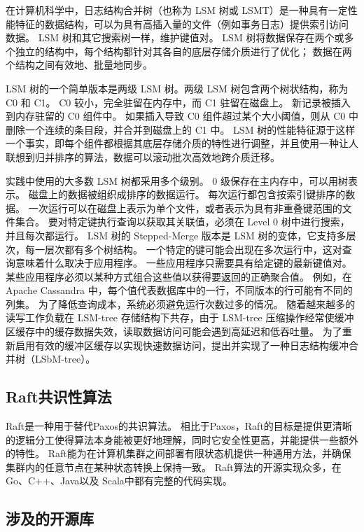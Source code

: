	在计算机科学中，日志结构合并树（也称为 LSM 树或 LSMT）是一种具有一定性能特征的数据结构，可以为具有高插入量的文件（例如事务日志）提供索引访问 数据。 
	LSM 树和其它搜索树一样，维护键值对。 LSM 树将数据保存在两个或多个独立的结构中，每个结构都针对其各自的底层存储介质进行了优化； 数据在两个结构之间有效地、批量地同步。

	LSM 树的一个简单版本是两级 LSM 树。两级 LSM 树包含两个树状结构，称为 C0 和 C1。 C0 较小，完全驻留在内存中，而 C1 驻留在磁盘上。 
	新记录被插入到内存驻留的 C0 组件中。 如果插入导致 C0 组件超过某个大小阈值，则从 C0 中删除一个连续的条目段，并合并到磁盘上的 C1 中。 
	LSM 树的性能特征源于这样一个事实，即每个组件都根据其底层存储介质的特性进行调整，并且使用一种让人联想到归并排序的算法，数据可以滚动批次高效地跨介质迁移。

	实践中使用的大多数 LSM 树都采用多个级别。 
	0 级保存在主内存中，可以用树表示。 
	磁盘上的数据被组织成排序的数据运行。 每次运行都包含按索引键排序的数据。 
	一次运行可以在磁盘上表示为单个文件，或者表示为具有非重叠键范围的文件集合。
	要对特定键执行查询以获取其关联值，必须在 Level 0 树中进行搜索，并且每次都运行。 
	LSM 树的 Stepped-Merge 版本是 LSM 树的变体，它支持多层次，每一层次都有多个树结构。
	一个特定的键可能会出现在多次运行中，这对查询意味着什么取决于应用程序。 一些应用程序只需要具有给定键的最新键值对。 某些应用程序必须以某种方式组合这些值以获得要返回的正确聚合值。 例如，在 Apache Cassandra 中，每个值代表数据库中的一行，不同版本的行可能有不同的列集。 
	为了降低查询成本，系统必须避免运行次数过多的情况。
	随着越来越多的读写工作负载在 LSM-tree 存储结构下共存，由于 LSM-tree 压缩操作经常使缓冲区缓存中的缓存数据失效，读取数据访问可能会遇到高延迟和低吞吐量。 
	为了重新启用有效的缓冲区缓存以实现快速数据访问，提出并实现了一种日志结构缓冲合并树（LSbM-tree）。 

	\subsection{Raft共识性算法}

	Raft是一种用于替代Paxos的共识算法。
	相比于Paxos，Raft的目标是提供更清晰的逻辑分工使得算法本身能被更好地理解，同时它安全性更高，并能提供一些额外的特性。
	Raft能为在计算机集群之间部署有限状态机提供一种通用方法，并确保集群内的任意节点在某种状态转换上保持一致。
	Raft算法的开源实现众多，在Go、C++、Java以及 Scala中都有完整的代码实现。

    \subsection{涉及的开源库}
	
